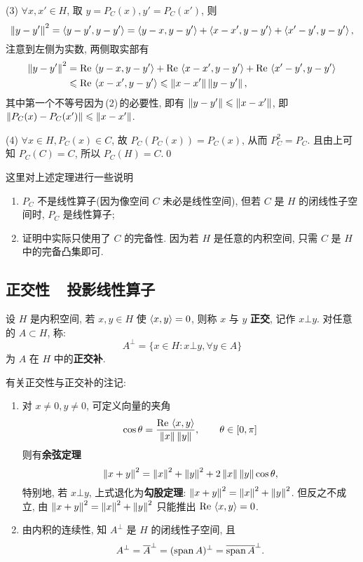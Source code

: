 \begin{Proof}
		(3) $ \forall x, x'\in H $, 取 $ y=P_{C}(x), y'=P_{C}(x') $, 则
		\[
			\left\| y-y' \right\|^{2}=\left\langle y-y', y-y' \right\rangle=\left\langle y-x, y-y' \right\rangle+\left\langle x-x', y-y' \right\rangle+\left\langle x'-y', y-y' \right\rangle,
		\]
		注意到左侧为实数, 两侧取实部有
		\[
			\begin{aligned}
				\left\| y-y' \right\|^{2} & =\mathrm{Re\,}\left\langle y-x, y-y' \right\rangle+\mathrm{Re\,}\left\langle x-x', y-y' \right\rangle+\mathrm{Re\,}\left\langle x'-y', y-y' \right\rangle\\
				& \leqslant \mathrm{Re\,}\left\langle x-x', y-y' \right\rangle\leqslant \left\| x-x' \right\|\left\| y-y' \right\|,
			\end{aligned}
		\]
		其中第一个不等号因为\,(2)\,的必要性, 即有 $ \left\| y-y' \right\|\leqslant\left\| x-x' \right\| $, 即 $ \left\| P_{C}(x)-P_{C}(x') \right\|\leqslant \left\| x-x' \right\| $.
		
		(4) $ \forall x\in H, P_{C}(x)\in C $, 故 $ P_{C}(P_{C}(x))=P_{C}(x) $, 从而 $ P_{C}^{2}=P_{C} $. 且由上可知 $ P_{C}(C)=C $, 所以 $ P_{C}(H)=C $.\qed
	\end{Proof}

	\begin{Remark}
		这里对上述定理进行一些说明
		\begin{enumerate}[(1)]
			\item $ P_{C} $ 不是线性算子(因为像空间 $ C $ 未必是线性空间), 但若 $ C $ 是 $ H $ 的闭线性子空间时, $ P_{C} $ 是线性算子;
			\item 证明中实际只使用了 $ C $ 的完备性. 因为若 $ H $ 是任意的内积空间, 只需 $ C $ 是 $ H $ 中的完备凸集即可.
		\end{enumerate}
	\end{Remark}

	\subsection{正交性\ \ 投影线性算子}

	\begin{Definition}[正交, 正交补]\label{def:正交, 正交补}
		 设 $ H $ 是内积空间,  若 $ x, y\in H $ 使 $ \left\langle x, y \right\rangle=0 $, 则称 $ x $ 与 $ y $ \textbf{正交}, 记作 $ x\bot y $. 对任意的 $ A\subset H $, 称:
		 \[
			A^{\bot}=\{ x\in H: x\bot y, \forall y\in A \} 
		 \]
		 为 $ A $ 在 $ H $ 中的\textbf{正交补}.
	\end{Definition}

	\begin{Remark}\label{rmk:正交性与正交补}
		有关正交性与正交补的注记:
		\begin{enumerate}[(1)]
			\item 对 $ x\ne0, y\ne 0 $, 可定义向量的夹角
			\[
				\cos\theta=\frac{\mathrm{Re\,}\left\langle x, y \right\rangle}{\left\| x \right\|\left\| y \right\|},\qquad \theta\in[0, \pi]
			\]
			则有\textbf{余弦定理}
			\[
				\left\| x+y \right\|^{2}=\left\| x \right\|^{2}+\left\| y \right\|^{2}+2\left\| x \right\|\left\| y \right\|\cos\theta,
			\]
			特别地, 若 $ x\bot y $, 上式退化为\textbf{勾股定理}: $ \left\| x+y \right\|^{2}=\left\| x \right\|^{2}+\left\| y \right\|^{2} $. 但反之不成立, 由 $ \left\| x+y \right\|^{2}=\left\| x \right\|^{2}+\left\| y \right\|^{2} $ 只能推出 $ \mathrm{Re\,}\left\langle x, y \right\rangle= 0 $.
			\item 由内积的连续性, 知 $ A^{\bot} $ 是 $ H $ 的闭线性子空间, 且
			\[
				A^{\bot}=\overline{A}^{\bot}=(\operatorname{span} A)^{\bot}=\overline{\operatorname{span} A}^{\bot}.
			\]
		\end{enumerate}
	\end{Remark}	
	
